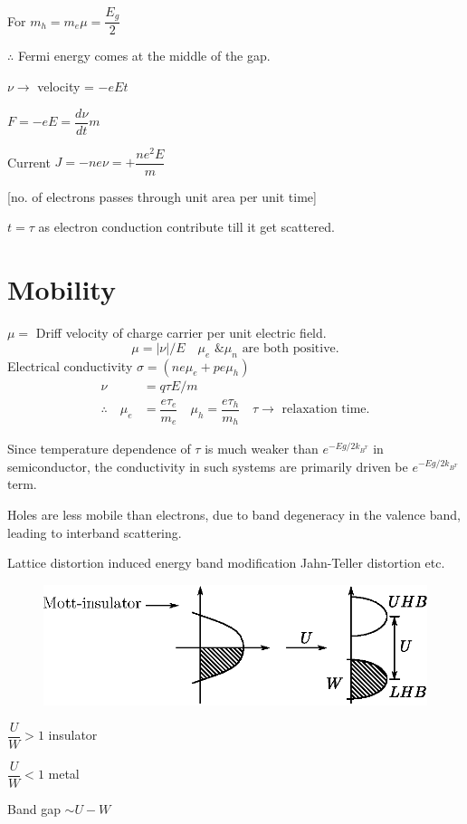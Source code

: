 For $m_{h}=m_{e}$\quad $\mu=\dfrac{E_{g}}{2}$

$\therefore$ Fermi energy comes at the middle of the gap.

$\nu\to$ velocity = $-eEt$

$F=-eE=\dfrac{d\nu}{dt}m$

Current $J=-ne\nu=+\dfrac{ne^{2}E}{m}$

[no. of electrons passes through unit area per unit time]

$t=\tau$ as electron conduction contribute till it get scattered.

\section*{Mobility}

$\mu=$ Driff velocity of charge carrier per unit electric field.
$$
\mu=|\nu|/E\quad \mu_{e} \text{ \& } \mu_{n}\text{ are both positive.}
$$
Electrical conductivity $\sigma=(ne\mu_{e}+pe\mu_{h})$
\begin{align*}
\nu &= q\tau E/m\\
\therefore\quad \mu_{e} &= \dfrac{e\tau_{e}}{m_{e}}\quad \mu_{h}=\dfrac{e\tau_{h}}{m_{h}}\quad \tau\to \text{ relaxation time.}
\end{align*}

Since temperature dependence of $\tau$ is much weaker than $e^{-Eg/2k_{B^{T}}}$ in semiconductor, the conductivity in such systems are primarily driven be $e^{-Eg/2k_{B^{T}}}$ term.

Holes are less mobile than electrons, due to band degeneracy in the valence band, leading to interband scattering.

Lattice distortion induced energy band modification Jahn-Teller distortion etc.
\begin{figure}[H]
\centering
\includegraphics[scale=.85]{images/lecture23/fig8.eps}
\end{figure}
$\dfrac{U}{W}>1$ insulator

\medskip

$\dfrac{U}{W}<1$ metal

\medskip

Band gap $\sim U-W$



 
